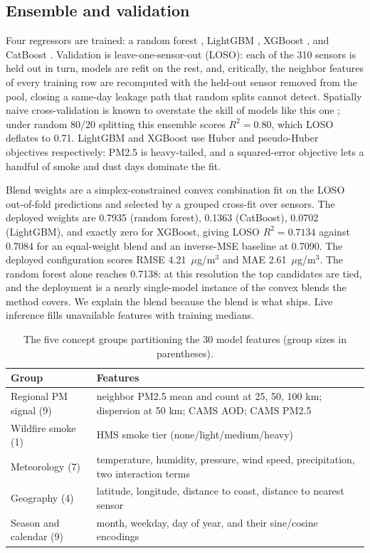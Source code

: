 \documentclass[conference]{IEEEtran}
\newcommand{\ugm}{$\mu$g/m$^3$}
\begin{document}
\subsection{Ensemble and validation}
Four regressors are trained: a random forest \cite{breiman2001}, LightGBM
\cite{ke2017}, XGBoost \cite{chen2016}, and CatBoost
\cite{prokhorenkova2018}. Validation is leave-one-sensor-out (LOSO): each of
the 310 sensors is held out in turn, models are refit on the rest, and,
critically, the neighbor features of every training row are recomputed with
the held-out sensor removed from the pool, closing a same-day leakage path
that random splits cannot detect. Spatially naive cross-validation is known
to overstate the skill of models like this one \cite{meyer2022}; under
random 80/20 splitting this ensemble scores $R^2=0.80$, which LOSO deflates
to 0.71. LightGBM and XGBoost use Huber and pseudo-Huber objectives
respectively: PM2.5 is heavy-tailed, and a squared-error objective lets a
handful of smoke and dust days dominate the fit.

Blend weights are a simplex-constrained convex combination fit on the LOSO
out-of-fold predictions and selected by a grouped cross-fit over sensors.
The deployed weights are 0.7935 (random forest), 0.1363 (CatBoost), 0.0702
(LightGBM), and exactly zero for XGBoost, giving LOSO $R^2=0.7134$ against
0.7084 for an equal-weight blend and an inverse-MSE baseline at 0.7090.
The deployed configuration scores RMSE 4.21~\ugm{} and MAE 2.61~\ugm{}. The random forest alone reaches
0.7138: at this resolution the top candidates are tied, and the deployment
is a nearly single-model instance of the convex blends the method covers.
We explain the blend because the blend is what ships. Live inference
fills unavailable features with training medians.

\begin{table}[!t]
\caption{The five concept groups partitioning the 30 model features
(group sizes in parentheses).}
\label{tab:groups}
\centering
\footnotesize
\begin{tabular}{>{\raggedright\arraybackslash}p{}>{\raggedright\arraybackslash}p{}}
\toprule
Group & Features \\
\midrule
Regional PM signal (9) & neighbor PM2.5 mean and count at 25, 50, 100 km;
dispersion at 50 km; CAMS AOD; CAMS PM2.5 \\
Wildfire smoke (1) & HMS smoke tier (none/light/medium/heavy) \\
Meteorology (7) & temperature, humidity, pressure, wind speed,
precipitation, two interaction terms \\
Geography (4) & latitude, longitude, distance to coast, distance to
nearest sensor \\
Season and calendar (9) & month, weekday, day of year, and their
sine/cosine encodings \\
\bottomrule
\end{tabular}
\end{table}
\end{document}
